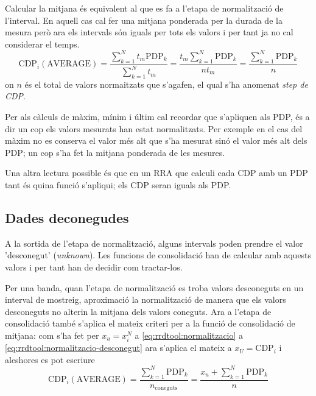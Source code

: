 

Calcular la mitjana és equivalent al que es fa a l'etapa de normalització de l'interval. En aquell cas cal fer una mitjana ponderada per la durada de la mesura però ara els intervals són iguals per tots els valors i per tant ja no cal considerar el temps. 
$$
\text{CDP}_i(\text{AVERAGE}) = \frac{\sum\limits_{k=1}^N t_m\text{PDP}_k }{\sum\limits_{k=1}^N t_m}
= \frac{t_m\sum\limits_{k=1}^N \text{PDP}_k}{nt_m}
= \frac{\sum\limits_{k=1}^N \text{PDP}_k}{n}
$$
on $n$ és el total de valors normaitzats que s'agafen, el qual s'ha anomenat \emph{step de CDP}.

Per als càlculs de màxim, mínim i últim cal recordar que s'apliquen als PDP, és a dir un cop els valors mesurats han estat normalitzats. Per exemple en el cas del màxim no es conserva el valor més alt que s'ha mesurat sinó el valor més alt dels PDP; un cop s'ha fet la mitjana ponderada de les mesures. 

Una altra lectura possible és que en un RRA que calculi cada CDP amb un PDP tant és quina funció s'apliqui; els CDP seran iguals als PDP.

\subsection{Dades deconegudes}\label{rrdtool:consolidacio:unknown}

A la sortida de l'etapa de normalització, alguns intervals poden prendre el valor 'desconegut' (\emph{unknown}). Les funcions de consolidació han de calcular amb aquests valors i per tant han de decidir com tractar-los.

Per una banda, quan l'etapa de normalització es troba valors desconeguts en un interval de mostreig, aproximació la normalització de manera que els valors desconeguts no alterin la mitjana dels valors coneguts. 
Ara a l'etapa de consolidació també s'aplica el mateix criteri per a la funció de consolidació de mitjana: com s'ha fet per $x_u=x_i^N$ a  \eqref{eq:rrdtool:normalitzacio} a \eqref{eq:rrdtool:normalitzacio-desconegut} ara s'aplica el mateix a $x_U=\text{CDP}_i$ i aleshores es pot escriure
$$
\text{CDP}_i(\text{AVERAGE}) = \frac{\sum\limits_{k=1}^N \text{PDP}_k}{n_{\text{coneguts}}} = \frac{x_u+\sum\limits_{k=1}^N \text{PDP}_k }{n}
$$



